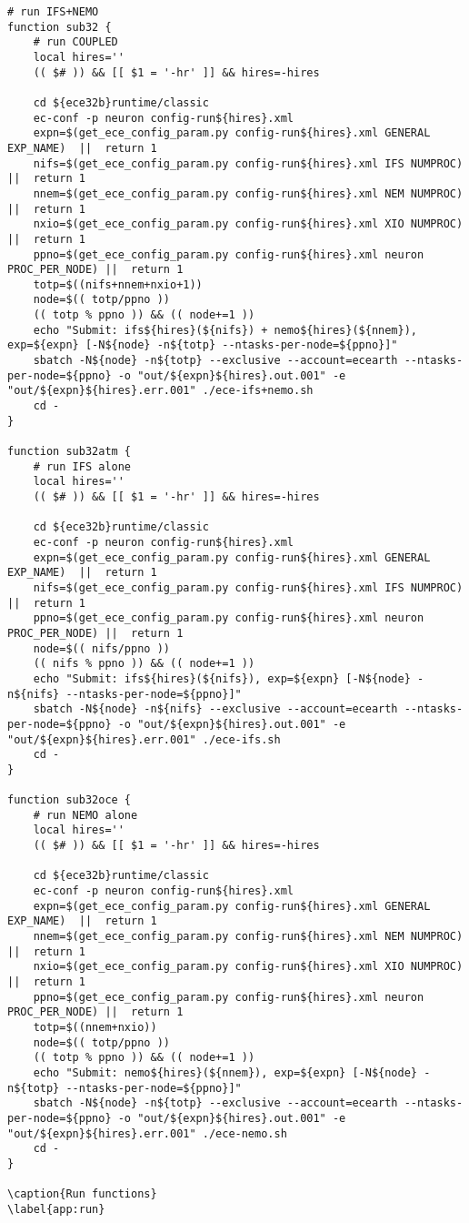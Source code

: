 \begin{lstlisting}
# run IFS+NEMO
function sub32 {
    # run COUPLED
    local hires=''
    (( $# )) && [[ $1 = '-hr' ]] && hires=-hires
    
    cd ${ece32b}runtime/classic
    ec-conf -p neuron config-run${hires}.xml
    expn=$(get_ece_config_param.py config-run${hires}.xml GENERAL EXP_NAME)  ||  return 1
    nifs=$(get_ece_config_param.py config-run${hires}.xml IFS NUMPROC)    ||  return 1
    nnem=$(get_ece_config_param.py config-run${hires}.xml NEM NUMPROC)    ||  return 1
    nxio=$(get_ece_config_param.py config-run${hires}.xml XIO NUMPROC)    ||  return 1
    ppno=$(get_ece_config_param.py config-run${hires}.xml neuron PROC_PER_NODE) ||  return 1 
    totp=$((nifs+nnem+nxio+1))
    node=$(( totp/ppno ))
    (( totp % ppno )) && (( node+=1 ))
    echo "Submit: ifs${hires}(${nifs}) + nemo${hires}(${nnem}), exp=${expn} [-N${node} -n${totp} --ntasks-per-node=${ppno}]"
    sbatch -N${node} -n${totp} --exclusive --account=ecearth --ntasks-per-node=${ppno} -o "out/${expn}${hires}.out.001" -e "out/${expn}${hires}.err.001" ./ece-ifs+nemo.sh
    cd -
}

function sub32atm {
    # run IFS alone
    local hires=''
    (( $# )) && [[ $1 = '-hr' ]] && hires=-hires

    cd ${ece32b}runtime/classic
    ec-conf -p neuron config-run${hires}.xml
    expn=$(get_ece_config_param.py config-run${hires}.xml GENERAL EXP_NAME)  ||  return 1
    nifs=$(get_ece_config_param.py config-run${hires}.xml IFS NUMPROC)    ||  return 1
    ppno=$(get_ece_config_param.py config-run${hires}.xml neuron PROC_PER_NODE) ||  return 1
    node=$(( nifs/ppno ))
    (( nifs % ppno )) && (( node+=1 ))
    echo "Submit: ifs${hires}(${nifs}), exp=${expn} [-N${node} -n${nifs} --ntasks-per-node=${ppno}]"
    sbatch -N${node} -n${nifs} --exclusive --account=ecearth --ntasks-per-node=${ppno} -o "out/${expn}${hires}.out.001" -e "out/${expn}${hires}.err.001" ./ece-ifs.sh
    cd -
}

function sub32oce {
    # run NEMO alone
    local hires=''
    (( $# )) && [[ $1 = '-hr' ]] && hires=-hires

    cd ${ece32b}runtime/classic
    ec-conf -p neuron config-run${hires}.xml
    expn=$(get_ece_config_param.py config-run${hires}.xml GENERAL EXP_NAME)  ||  return 1
    nnem=$(get_ece_config_param.py config-run${hires}.xml NEM NUMPROC)    ||  return 1
    nxio=$(get_ece_config_param.py config-run${hires}.xml XIO NUMPROC)    ||  return 1
    ppno=$(get_ece_config_param.py config-run${hires}.xml neuron PROC_PER_NODE) ||  return 1
    totp=$((nnem+nxio))
    node=$(( totp/ppno ))
    (( totp % ppno )) && (( node+=1 ))
    echo "Submit: nemo${hires}(${nnem}), exp=${expn} [-N${node} -n${totp} --ntasks-per-node=${ppno}]"
    sbatch -N${node} -n${totp} --exclusive --account=ecearth --ntasks-per-node=${ppno} -o "out/${expn}${hires}.out.001" -e "out/${expn}${hires}.err.001" ./ece-nemo.sh
    cd -
}

\caption{Run functions}
\label{app:run}
\end{lstlisting}

\iffalse
\section{Glossary and Abbreviations}

\newglossaryentry{term}
{
  name=term,
  description={is a test term}
}
\newacronym[longplural={Frames per Second}]{fpsLabel}{FPS}{Frame per Second}

\printglossaries

\fi